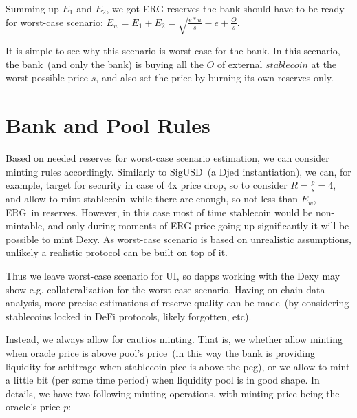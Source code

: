 \documentclass{article}   %
\newcommand{\bc}{ERG}
\newcommand{\sct}{stablecoin}
\newcommand{\dx}{Dexy}
\begin{document}
Summing up $E_1$ and $E_2$, we got \bc{} reserves the bank should have to be ready for worst-case scenario: $E_w = E_1 + E_2 = \sqrt{\frac{e * u}{s}} - e + \frac{O}{s}$.

It is simple to see why this scenario is worst-case for the bank. In this scenario, the bank~(and only the bank) is buying all the $O$ of external $\sct{}$ at the worst possible price $s$, and also set the price by burning its own reserves only.  

\section{Bank and Pool Rules}
\label{detailed-rules}

Based on needed reserves for worst-case scenario estimation, we can consider minting rules accordingly. Similarly to SigUSD~(a Djed instantiation), we can, for example, target for security in case of 
4x price drop, so to consider $R = \frac{p}{s} = 4$, and allow to mint \sct{}~while there are enough, so not less than $E_w$, \bc{}~in reserves. However, in this case most of time \sct{} would be non-mintable, and only during moments of \bc{} price going up significantly it will be possible to mint \dx{}. As worst-case scenario is based on unrealistic assumptions, unlikely a realistic protocol can be built on top of it.  

Thus we leave worst-case scenario for UI, so dapps working with the \dx{} may show e.g. collateralization for the worst-case scenario. Having on-chain data analysis, more precise estimations of reserve quality can be made~(by considering \sct{}s locked in DeFi protocols, likely forgotten, etc).

Instead, we always allow for cautios minting. That is, we whether allow minting when oracle price is above pool's price~(in this way the bank is providing liquidity for arbitrage when \sct{} pice is above the peg), or we allow to mint a little bit (per some time period) when liquidity pool is in good shape. In details, we have two following minting operations, with minting price being the oracle's price $p$:  
\end{document}
